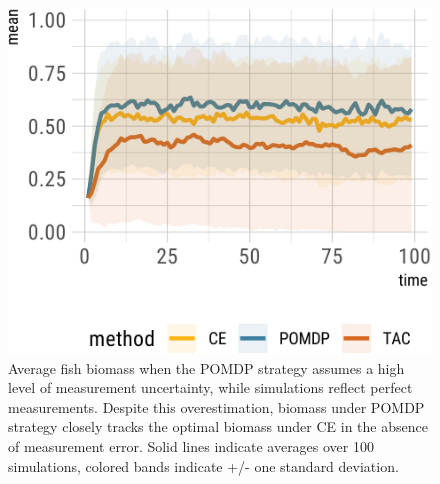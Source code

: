 \documentclass[3p]{elsarticle} %
\makeatletter
\def\maxwidth{\ifdim\Gin@nat@width>\linewidth\linewidth
\else\Gin@nat@width\fi}
\let\Oldincludegraphics\includegraphics
\renewcommand{\includegraphics}[1]{\Oldincludegraphics[width=\maxwidth]{#1}}
\makeatother
\begin{document}
\begin{figure}
\centering
\includegraphics{manuscript_files/figure-latex/overest-1.pdf}
\caption{Average fish biomass when the POMDP strategy assumes a high
level of measurement uncertainty, while simulations reflect perfect
measurements. Despite this overestimation, biomass under POMDP strategy
closely tracks the optimal biomass under CE in the absence of
measurement error. Solid lines indicate averages over 100 simulations,
colored bands indicate +/- one standard deviation. \label{overest}}
\end{figure}
\end{document}
